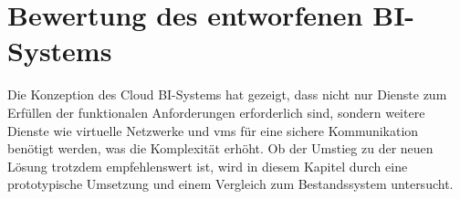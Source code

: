 \chapter{Bewertung des entworfenen BI-Systems} \label{ch:praktischeUmsetzung}
Die Konzeption des Cloud BI-Systems hat gezeigt, dass nicht nur Dienste zum Erfüllen der funktionalen Anforderungen erforderlich sind, sondern weitere Dienste wie virtuelle Netzwerke und \acp{vm} für eine sichere Kommunikation benötigt werden, was die Komplexität erhöht. Ob der Umstieg zu der neuen Lösung trotzdem empfehlenswert ist, wird in diesem Kapitel durch eine prototypische Umsetzung und einem Vergleich zum Bestandssystem untersucht.




